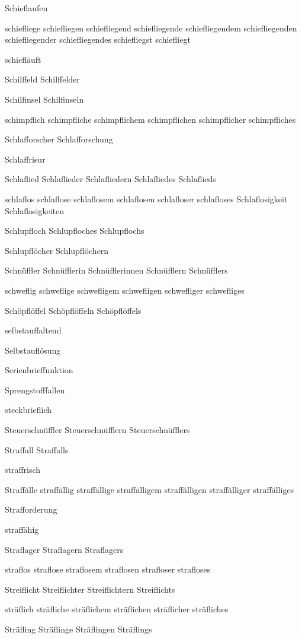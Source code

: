 Schieflaufen

schiefliege schiefliegen schiefliegend schiefliegende schiefliegendem schiefliegenden schiefliegender schiefliegendes schiefliegst schiefliegt

schiefläuft

Schilffeld Schilffelder %

Schilfinsel Schilfinseln

schimpflich schimpfliche schimpflichem schimpflichen schimpflicher schimpfliches

Schlafforscher Schlafforschung

Schlaffrisur 

Schlaflied Schlaflieder Schlafliedern Schlafliedes Schlaflieds

schlaflos schlaflose schlaflosem schlaflosen schlafloser schlafloses Schlaflosigkeit Schlaflosigkeiten

Schlupfloch Schlupfloches Schlupflochs

Schlupflöcher Schlupflöchern

Schnüffler Schnüfflerin Schnüfflerinnen Schnüfflern Schnüfflers

schweflig schweflige schwefligem schwefligen schwefliger schwefliges

Schöpflöffel Schöpflöffeln Schöpflöffels

selbstauffaltend

Selbstauflösung

Serienbrieffunktion

Sprengstofffallen

steckbrieflich

Steuerschnüffler Steuerschnüfflern Steuerschnüfflers

Straffall Straffalls

straffrisch

Straffälle straffällig straffällige straffälligem straffälligen straffälliger straffälliges

Strafforderung

straffähig

Straflager Straflagern Straflagers

straflos straflose straflosem straflosen strafloser strafloses

Streiflicht Streiflichter Streiflichtern Streiflichts

sträflich sträfliche sträflichem sträflichen sträflicher sträfliches

Sträfling Sträflinge Sträflingen Sträflings


